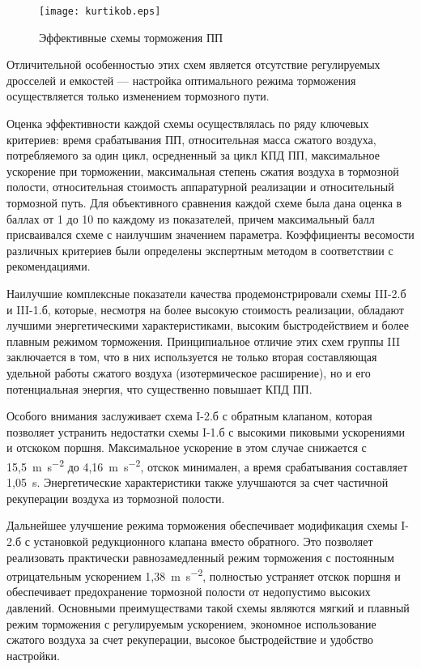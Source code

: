 \begin{figure}[h]
    \centerfloat
    \texttt{[image: kurtikob.eps]}
    \caption{Эффективные схемы торможения ПП}\label{fig:эффективные_схемы_торможения_12}
\end{figure}

Отличительной особенностью этих схем является отсутствие регулируемых дросселей и емкостей ---
настройка оптимального режима торможения осуществляется только изменением тормозного пути.

Оценка эффективности каждой схемы осуществлялась по ряду ключевых критериев: время срабатывания ПП,
относительная масса сжатого воздуха, потребляемого за один цикл, осредненный за цикл КПД ПП, максимальное
ускорение при торможении, максимальная степень сжатия воздуха в тормозной полости, относительная стоимость
аппаратурной реализации и относительный тормозной путь. Для объективного сравнения каждой схеме была дана оценка в
баллах от 1 до 10 по каждому из показателей, причем максимальный балл присваивался схеме с наилучшим значением
параметра. Коэффициенты весомости различных критериев были определены экспертным методом в соответствии с
рекомендациями.

Наилучшие комплексные показатели качества продемонстрировали схемы III-2.б и III-1.б, которые, несмотря на
более высокую стоимость реализации, обладают лучшими энергетическими характеристиками, высоким быстродействием
и более плавным режимом торможения. Принципиальное отличие этих схем группы III заключается в том, что в них
используется не только вторая составляющая удельной работы сжатого воздуха (изотермическое расширение), но и его
потенциальная энергия, что существенно повышает КПД ПП.

Особого внимания заслуживает схема I-2.б с обратным клапаном, которая позволяет устранить недостатки схемы I-1.б
с высокими пиковыми ускорениями и отскоком поршня. Максимальное ускорение в этом случае снижается с 15,5~\si{\metre\per\square\second}
до 4,16~\si{\metre\per\square\second}, отскок минимален, а время срабатывания составляет 1,05~\si{\second}. Энергетические характеристики также улучшаются
за счет частичной рекуперации воздуха из тормозной полости.

Дальнейшее улучшение режима торможения обеспечивает модификация схемы I-2.б с установкой редукционного клапана вместо
обратного. Это позволяет реализовать практически равнозамедленный режим торможения с постоянным отрицательным
ускорением 1,38~\si{\metre\per\square\second}, полностью устраняет отскок поршня и обеспечивает предохранение тормозной полости от недопустимо
высоких давлений. Основными преимуществами такой схемы являются мягкий и плавный режим торможения с регулируемым
ускорением, экономное использование сжатого воздуха за счет рекуперации, высокое быстродействие и удобство настройки.

